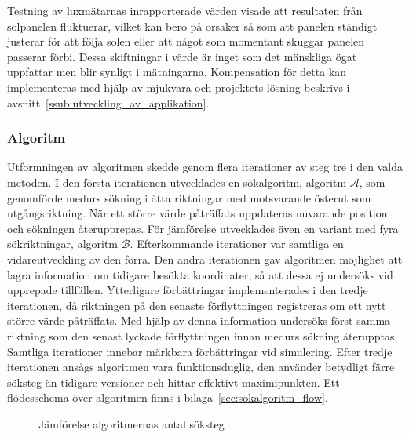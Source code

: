             Testning av luxmätarnas inrapporterade värden visade att resultaten från solpanelen fluktuerar, vilket kan bero på orsaker så som att panelen ständigt justerar för att följa solen eller att något som momentant skuggar panelen passerar förbi. Dessa skiftningar i värde är inget som det mänskliga ögat uppfattar men blir synligt i mätningarna. Kompensation för detta kan implementeras med hjälp av mjukvara och projektets lösning beskrivs i avsnitt~\ref{ssub:utveckling_av_applikation}.\bigskip




        \subsubsection{Algoritm} %
        \label{ssub:utveckling_av_algoritm}
            Utformningen av algoritmen skedde genom flera iterationer av steg tre i den valda metoden. I den första iterationen utvecklades en sökalgoritm, algoritm $\mathscr{A}$, som genomförde medurs sökning i åtta riktningar med motsvarande österut som utgångsriktning. När ett större värde påträffats uppdateras nuvarande position och sökningen återupprepas. För jämförelse utvecklades även en variant med fyra sökriktningar, algoritm $\mathscr{B}$. Efterkommande iterationer var samtliga en vidareutveckling av den förra. Den andra iterationen gav algoritmen möjlighet att lagra information om tidigare besökta koordinater, så att dessa ej undersöks vid upprepade tillfällen. Ytterligare förbättringar implementerades i den tredje iterationen, då riktningen på den senaste förflyttningen registreras om ett nytt större värde påträffats. Med hjälp av denna information undersöks först samma riktning som den senast lyckade förflyttningen innan medurs sökning återupptas. Samtliga iterationer innebar märkbara förbättringar vid simulering. Efter tredje iterationen ansågs algoritmen vara funktionsduglig, den använder betydligt färre söksteg än tidigare versioner och hittar effektivt maximipunkten. Ett flödesschema över algoritmen finns i bilaga~\ref{sec:sokalgoritm_flow}.\bigskip

            \begin{figure}
                
            \caption{\label{fig:algoritm_steg} Jämförelse algoritmernas antal söksteg}
            \end{figure} 

